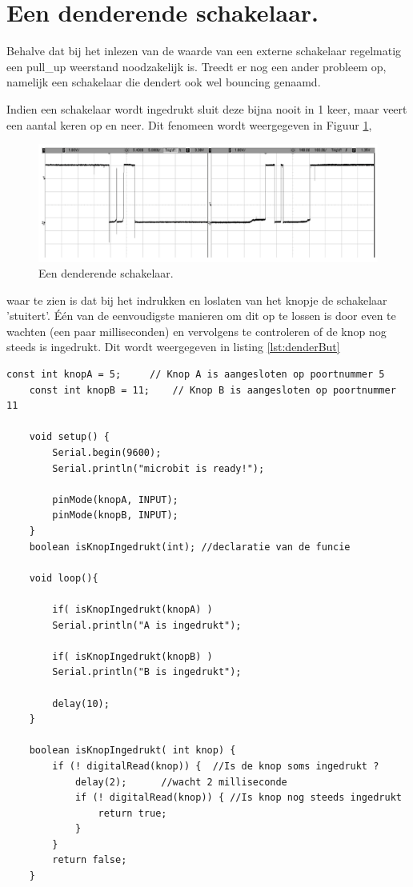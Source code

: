 \section{Een denderende schakelaar.}

Behalve dat bij het inlezen van de waarde van een externe schakelaar regelmatig een pull\_up weerstand noodzakelijk is. 
Treedt er nog een ander probleem op, namelijk een schakelaar die dendert ook wel bouncing genaamd.

Indien een schakelaar wordt ingedrukt sluit deze bijna nooit in 1 keer, maar veert een aantal keren op en neer. Dit fenomeen wordt weergegeven in Figuur \ref{fig:swDend}, 
\begin{figure}[h!]
	\captionsetup{justification=centering}
	\includegraphics[width=0.6 \linewidth]{figuren/denderen}
	\centering
	\caption{Een denderende schakelaar\cite{williams2014make}.}
	\label{fig:swDend}
\end{figure}
waar te zien is dat bij het indrukken en loslaten van het knopje de schakelaar 'stuitert'. 
Één van de eenvoudigste manieren om dit op te lossen is door even te wachten (een paar milliseconden) en vervolgens te controleren of de knop nog steeds is ingedrukt. Dit wordt weergegeven in listing \ref{lst:denderBut}
\newpage
\begin{lstlisting}[caption= Omgaan met een denderende schakelaar.,label={lst:denderBut}]
	const int knopA = 5;     // Knop A is aangesloten op poortnummer 5
	const int knopB = 11;    // Knop B is aangesloten op poortnummer 11
	
	void setup() {  
		Serial.begin(9600);
		Serial.println("microbit is ready!");
		
		pinMode(knopA, INPUT);  
		pinMode(knopB, INPUT);   
	}
	boolean isKnopIngedrukt(int); //declaratie van de funcie
	
	void loop(){
		
		if( isKnopIngedrukt(knopA) )
		Serial.println("A is ingedrukt");
		
		if( isKnopIngedrukt(knopB) )
		Serial.println("B is ingedrukt");       
		
		delay(10);
	}
	
	boolean isKnopIngedrukt( int knop) {
		if (! digitalRead(knop)) {  //Is de knop soms ingedrukt ?
			delay(2);      //wacht 2 milliseconde 
			if (! digitalRead(knop)) { //Is knop nog steeds ingedrukt
				return true;
			}
		}
		return false;
	}
\end{lstlisting}

